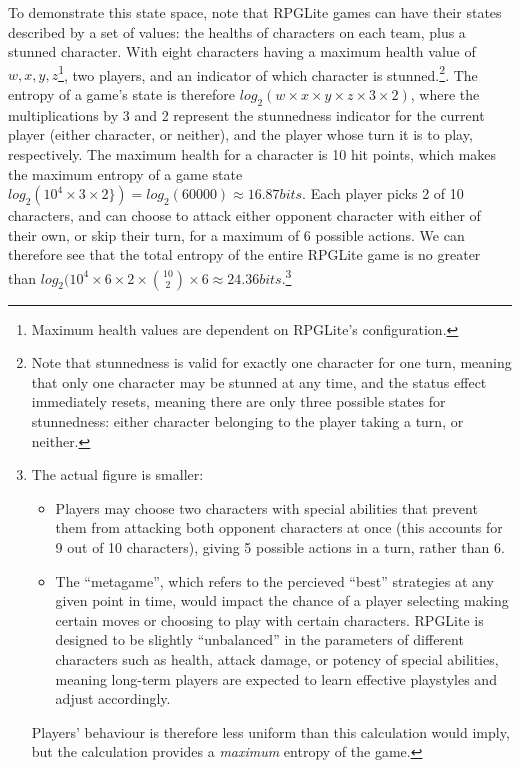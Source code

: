 To demonstrate this state space, note that RPGLite games can have their states
described by a set of values: the healths of characters on each team, plus a
stunned character. With eight characters having a maximum health value of $w, x,
y, z$\footnote{Maximum health values are dependent on RPGLite's configuration.},
two players, and an indicator of which character is stunned.\footnote{Note that
stunnedness is valid for exactly one character for one turn, meaning that only
one character may be stunned at any time, and the status effect immediately
resets, meaning there are only three possible states for stunnedness: either
character belonging to the player taking a turn, or neither.}. The entropy of a
game's state is therefore
\(log_2(w\times{}x\times{}y\times{}z\times{}3\times{}2)\), where the
multiplications by 3 and 2 represent the stunnedness indicator for the current
player (either character, or neither), and the player whose turn it is to play,
respectively. The maximum health for a character is 10 hit points, which makes
the maximum entropy of a game state \(log_2(10^{4}\times{}3\times{}2\}) =
log_2(60000) \approx 16.87 bits\). Each player picks 2 of 10 characters, and can
choose to attack either opponent character with either of their own, or skip
their turn, for a maximum of 6 possible actions. We can therefore see that the
total entropy of the entire RPGLite game is no greater than
\(log_2(10^{4}\times{}6\times{}2\times{}{10\choose2}\times{}6 \approx 24.36
bits\).\footnote{The actual figure is smaller: \begin{itemize}\item Players may
choose two characters with special abilities that prevent them from attacking
both opponent characters at once (this accounts for 9 out of 10 characters),
giving 5 possible actions in a turn, rather than 6.\item The ``metagame'', which
refers to the percieved ``best'' strategies at any given point in time, would
impact the chance of a player selecting making certain moves or choosing to play
with certain characters. RPGLite is designed to be slightly ``unbalanced'' in
the parameters of different characters such as health, attack damage, or potency
of special abilities, meaning long-term players are expected to learn effective
playstyles and adjust accordingly.\end{itemize}\par{}\indent{}Players' behaviour
is therefore less uniform than this calculation would imply, but the calculation
provides a \emph{maximum} entropy of the game.}

